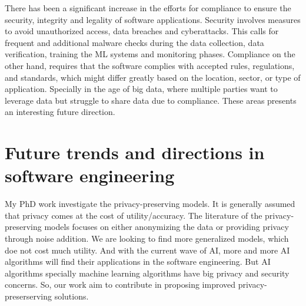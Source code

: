 \documentclass{article}
\begin{document}
There has been a significant increase in the efforts for compliance to ensure the security, integrity and legality of software applications. Security involves measures to avoid unauthorized access, data breaches and cyberattacks. This calls for frequent and additional malware checks during the data collection, data verification, training the ML systems and monitoring phases. Compliance on the other hand, requires that the software complies with accepted rules, regulations, and standards, which might differ greatly based on the location, sector, or type of application. 
Specially in the age of big data, where multiple parties want to leverage data but struggle to share data due to compliance. These areas presents an interesting future direction. 


\section{Future trends and directions in software engineering}

My PhD work investigate the privacy-preserving models. It is generally assumed that privacy comes at the cost of utility/accuracy. The literature of the privacy-preserving models focuses on either anonymizing the data or providing privacy through noise addition. We are looking to find more generalized models, which doe not cost much utility. And with the current wave of AI, more and more AI algorithms will find their applications in the software engineering. But AI algorithms specially machine learning algorithms have big privacy and security concerns. So, our work aim to contribute in proposing improved privacy-preserserving solutions. 
\end{document}
